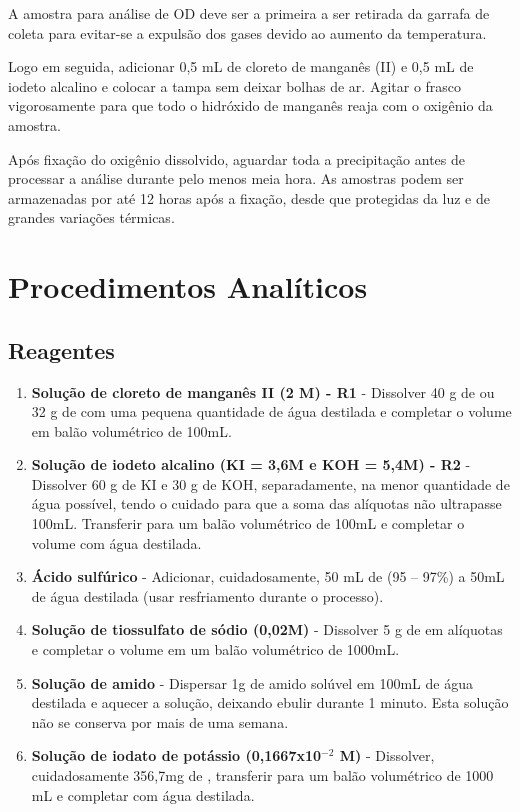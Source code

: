 \documentclass[a4paper,10pt]{SelfArx}
\begin{document}
A amostra para análise de OD deve ser a primeira a ser retirada da garrafa de coleta para evitar-se a expulsão dos gases devido ao aumento da temperatura.

Logo em seguida, adicionar 0,5 mL de cloreto de manganês (II) e 0,5 mL de iodeto alcalino e colocar a tampa sem deixar bolhas de ar. Agitar o frasco vigorosamente para que todo o hidróxido de manganês reaja com o oxigênio da amostra.

Após fixação do oxigênio dissolvido, aguardar toda a precipitação antes de processar a análise durante pelo menos meia hora. As amostras podem ser armazenadas por até 12 horas após a fixação, desde que protegidas da luz e de grandes variações térmicas.

\section{Procedimentos Analíticos}

\subsection{Reagentes}

\begin{enumerate}[noitemsep]
\item \textbf {Solução de cloreto de manganês II (2 M) - R1} - Dissolver 40 g de  ou 32 g de  com uma pequena quantidade de água destilada e completar o volume em balão volumétrico de 100mL.
\item \textbf{Solução de iodeto alcalino (KI = 3,6M e KOH = 5,4M) - R2} - Dissolver 60 g de KI e 30 g de KOH, separadamente, na menor quantidade de água possível, tendo o cuidado para que a soma das alíquotas não ultrapasse 100mL. Transferir para um balão volumétrico de 100mL e completar o volume com água destilada.
\item \textbf{Ácido sulfúrico} - Adicionar, cuidadosamente, 50 mL de  (95 -- 97\%) a 50mL de água destilada (usar resfriamento durante o processo).
\item \textbf{Solução de tiossulfato de sódio (0,02M)} - Dissolver 5 g de  em alíquotas e completar o volume em um balão volumétrico de 1000mL.
\item \textbf{Solução de amido} - Dispersar 1g de amido solúvel em 100mL de água destilada e aquecer a solução, deixando ebulir durante 1 minuto. Esta solução não se conserva por mais de uma semana.
\item \textbf{Solução de iodato de potássio (0,1667x10$^{-2}$ M)} - Dissolver, cuidadosamente 356,7mg de , transferir para um balão volumétrico de 1000 mL e completar com água destilada.
\end{enumerate}
\end{document}

